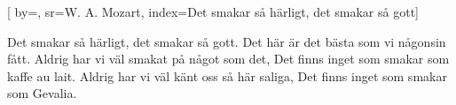 

[ 		%
	by={},					%
	sr={W. A. Mozart},					%
	index={Det smakar så härligt, det smakar så gott}]						%
	
\beginverse*						%
Det smakar så härligt, det smakar så gott.
Det här är det bästa som vi någonsin fått. 
Aldrig har vi väl smakat på något som det,
Det finns inget som smakar som kaffe au lait.
Aldrig har vi väl känt oss så här saliga,
Det finns inget som smakar som Gevalia.
\endverse							%

\endsong							%